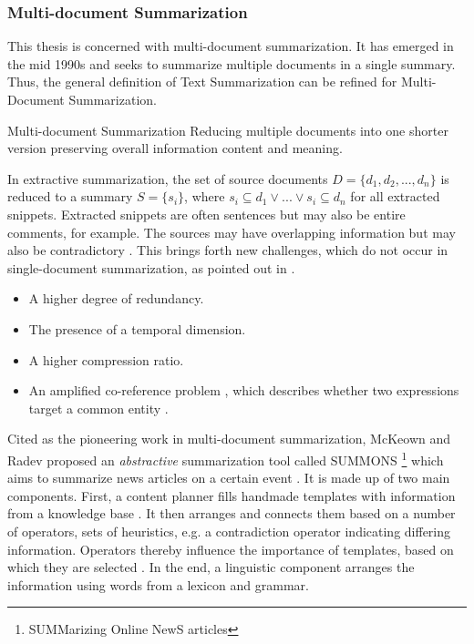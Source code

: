 \subsubsection{Multi-document Summarization}
This thesis is concerned with multi-document summarization. It has emerged in the mid 1990s \cite{Das07asurvey} and seeks to summarize multiple documents in a single summary.
Thus, the general definition of Text Summarization can be refined for Multi-Document Summarization.
\begin{definition}{Multi-document Summarization} Reducing multiple documents into one shorter version preserving overall information content and meaning.
\end{definition}
In extractive summarization, the set of source documents $D = \{d_1, d_2,..., d_n\}$ is reduced to a summary $S = \{s_i\}$, where $s_i \subseteq d_1 \lor ... \lor s_i \subseteq d_n$ for all extracted snippets. Extracted snippets are often sentences but may also be entire comments, for example.
The sources may have overlapping information but may also be contradictory \cite{Das07asurvey, Goldstein:2000:MSS:1117575.1117580}. This brings forth new challenges, which do not occur in single-document summarization, as pointed out in \cite{Goldstein:2000:MSS:1117575.1117580}.
\begin{itemize}
\item A higher degree of redundancy. \cite{Goldstein:2000:MSS:1117575.1117580}
\item The presence of a temporal dimension. \cite{Goldstein:2000:MSS:1117575.1117580}
\item A higher compression ratio. \cite{Goldstein:2000:MSS:1117575.1117580}
\item An amplified co-reference problem \cite{Goldstein:2000:MSS:1117575.1117580}, which describes whether two expressions target a common entity \cite{DBLP:journals/coling/SoonNL01}.
\end{itemize}
Cited as the pioneering work \cite{Das07asurvey} in multi-document summarization, McKeown and Radev \cite{McKeown:1995:GSM:215206.215334, Radev:1998:GNL:972749.972755} proposed an \textit{abstractive} summarization tool called SUMMONS \footnote{SUMMarizing Online NewS articles} which aims to summarize news articles on a certain event \cite{Radev:1998:GNL:972749.972755}.
It is made up of two main components. First, a content planner fills handmade templates \cite{Das07asurvey} with information from a knowledge base \cite{McKeown:1995:GSM:215206.215334}. It then arranges and connects them based on a number of operators, sets of heuristics, e.g. a contradiction operator indicating differing information. Operators thereby influence the importance of templates, based on which they are selected \cite{McKeown:1995:GSM:215206.215334}. In the end, a linguistic component arranges the information using words from a lexicon and grammar.

